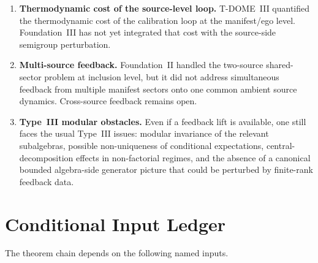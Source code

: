 \documentclass[12pt]{article}
\theoremstyle{definition}
\theoremstyle{remark}
\begin{document}
\begin{enumerate}
  \(\mathscr L_\eta\) is applied repeatedly, one faces an entirely new
  dynamical question: do the semigroups converge, cycle, or wander? The
  present paper does not address that long-time behavior.
\item \textbf{Thermodynamic cost of the source-level loop.} T-DOME~III
  quantified the thermodynamic cost of the calibration loop at the
  manifest/ego level. Foundation~III has not yet integrated that cost
  with the source-side semigroup perturbation.
\item \textbf{Multi-source feedback.} Foundation~II handled the
  two-source shared-sector problem at inclusion level, but it did not
  address simultaneous feedback from multiple manifest sectors onto one
  common ambient source dynamics. Cross-source feedback remains open.
\item \textbf{Type~III modular obstacles.} Even if a feedback lift is
  available, one still faces the usual Type~III issues: modular
  invariance of the relevant subalgebras, possible non-uniqueness of
  conditional expectations, central-decomposition effects in
  non-factorial regimes, and the absence of a canonical bounded
  algebra-side generator picture that could be perturbed by finite-rank
  feedback data.
\end{enumerate}

\section{Conditional Input Ledger}\label{sec:ledger}

The theorem chain depends on the following named inputs.
\end{document}
